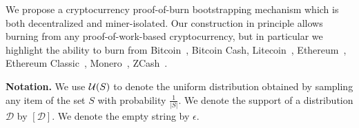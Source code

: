 We propose a cryptocurrency proof-of-burn bootstrapping mechanism which is both
decentralized and miner-isolated. Our construction in principle allows burning
from any proof-of-work-based cryptocurrency, but in particular we highlight the
ability to burn from Bitcoin~\cite{bitcoin},
Bitcoin Cash, Litecoin~\cite{lee2011litecoin},
Ethereum~\cite{buterin2014next,wood2014ethereum}, Ethereum
Classic~\cite{classic2017ethereum}, Monero~\cite{van2013cryptonote},
ZCash~\cite{SP:BCGGMT14,hopwood2016zcash}.

\noindent
\textbf{Notation.} We use $\mathcal{U}(S)$ to denote the uniform distribution
obtained by sampling any item of the set $S$ with probability $\frac{1}{|S|}$.
We denote the support of a distribution $\mathcal{D}$ by $[\mathcal{D}]$.
We denote the empty string by $\epsilon$.
